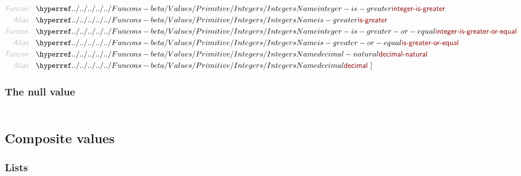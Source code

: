 \begin{align*}
  \KEY{Funcon} \quad & \NAMEHYPER{../../../../../Funcons-beta/Values/Primitive}{Integers}{integer-is-greater} \\
  \KEY{Alias} \quad & \NAMEHYPER{../../../../../Funcons-beta/Values/Primitive}{Integers}{is-greater} \\
  \KEY{Funcon} \quad & \NAMEHYPER{../../../../../Funcons-beta/Values/Primitive}{Integers}{integer-is-greater-or-equal} \\
  \KEY{Alias} \quad & \NAMEHYPER{../../../../../Funcons-beta/Values/Primitive}{Integers}{is-greater-or-equal} \\
  \KEY{Funcon} \quad & \NAMEHYPER{../../../../../Funcons-beta/Values/Primitive}{Integers}{decimal-natural} \\
  \KEY{Alias} \quad & \NAMEHYPER{../../../../../Funcons-beta/Values/Primitive}{Integers}{decimal}
  \ ]
\end{align*}
\subsubsection{The null value}\hypertarget{the-null-value}{}\label{the-null-value}

\begin{align*}
  [ \
  \KEY{Datatype} \quad & \NAMEHYPER{../../../../../Funcons-beta/Values/Primitive}{Null}{null-type} \\
  \KEY{Funcon} \quad & \NAMEHYPER{../../../../../Funcons-beta/Values/Primitive}{Null}{null-value} \\
  \KEY{Alias} \quad & \NAMEHYPER{../../../../../Funcons-beta/Values/Primitive}{Null}{null}
  \ ]
\end{align*}
\subsection{Composite values}\hypertarget{composite-values}{}\label{composite-values}

\subsubsection{Lists}\hypertarget{lists}{}\label{lists}

